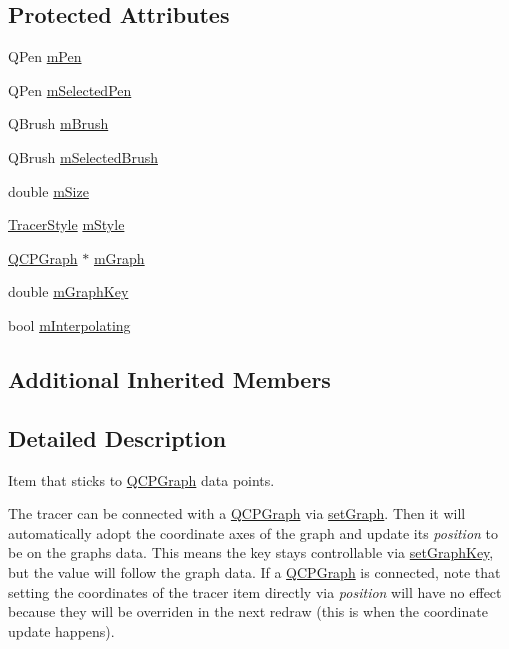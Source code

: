 \subsection*{Protected Attributes}
\begin{DoxyCompactItemize}
\item 
Q\+Pen \hyperlink{classQCPItemTracer_a579e3bd6bd16d6aaff03638dc8a99a69}{m\+Pen}
\item 
Q\+Pen \hyperlink{classQCPItemTracer_a3f61829784200819661d1e2a5354d866}{m\+Selected\+Pen}
\item 
Q\+Brush \hyperlink{classQCPItemTracer_a6597be63a17a266233941354200b2340}{m\+Brush}
\item 
Q\+Brush \hyperlink{classQCPItemTracer_a1c15d2adde40efdcc0ef1ff78fd256a6}{m\+Selected\+Brush}
\item 
double \hyperlink{classQCPItemTracer_a575153a24bb357d1e006f6bc3bd099b9}{m\+Size}
\item 
\hyperlink{classQCPItemTracer_a2f05ddb13978036f902ca3ab47076500}{Tracer\+Style} \hyperlink{classQCPItemTracer_afb1f236bebf417544e0138fef22a292e}{m\+Style}
\item 
\hyperlink{classQCPGraph}{Q\+C\+P\+Graph} $\ast$ \hyperlink{classQCPItemTracer_a2d70cf616b579563aa15f796dfc143ac}{m\+Graph}
\item 
double \hyperlink{classQCPItemTracer_a8fa20f2e9ee07d21fd7c8d30ba4702ca}{m\+Graph\+Key}
\item 
bool \hyperlink{classQCPItemTracer_afab37c22ad39f235921e86f93cd84595}{m\+Interpolating}
\end{DoxyCompactItemize}
\subsection*{Additional Inherited Members}


\subsection{Detailed Description}
Item that sticks to \hyperlink{classQCPGraph}{Q\+C\+P\+Graph} data points. 

 The tracer can be connected with a \hyperlink{classQCPGraph}{Q\+C\+P\+Graph} via \hyperlink{classQCPItemTracer_af5886f4ded8dd68cb4f3388f390790c0}{set\+Graph}. Then it will automatically adopt the coordinate axes of the graph and update its {\itshape position} to be on the graph\textquotesingle{}s data. This means the key stays controllable via \hyperlink{classQCPItemTracer_a6840143b42f3b685cedf7c6d83a704c8}{set\+Graph\+Key}, but the value will follow the graph data. If a \hyperlink{classQCPGraph}{Q\+C\+P\+Graph} is connected, note that setting the coordinates of the tracer item directly via {\itshape position} will have no effect because they will be overriden in the next redraw (this is when the coordinate update happens).

